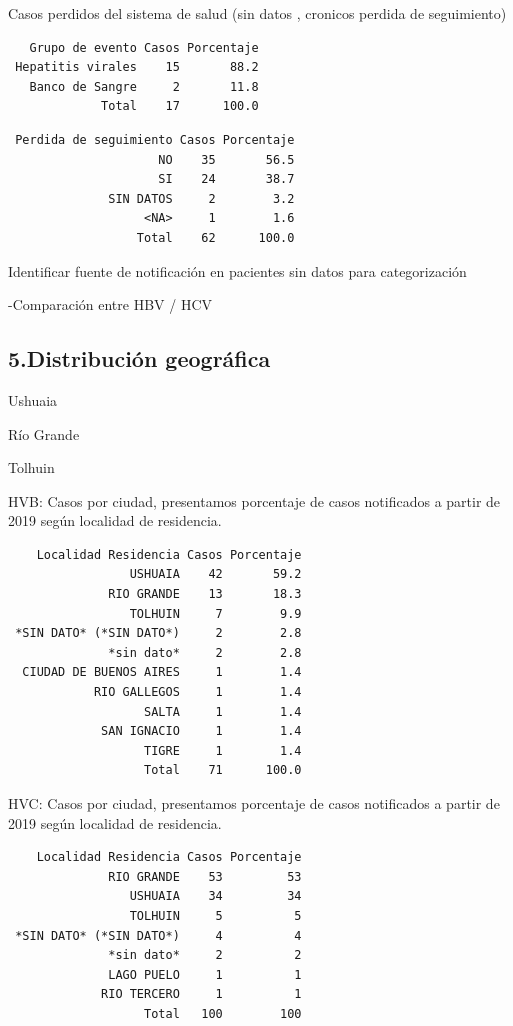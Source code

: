 \documentclass[
  letterpaper,
  DIV=11,
  numbers=noendperiod]{scrartcl}
\begin{document}
Casos perdidos del sistema de salud (sin datos , cronicos perdida de
seguimiento)

\begin{verbatim}
   Grupo de evento Casos Porcentaje
 Hepatitis virales    15       88.2
   Banco de Sangre     2       11.8
             Total    17      100.0
\end{verbatim}

\begin{verbatim}
 Perdida de seguimiento Casos Porcentaje
                     NO    35       56.5
                     SI    24       38.7
              SIN DATOS     2        3.2
                   <NA>     1        1.6
                  Total    62      100.0
\end{verbatim}

Identificar fuente de notificación en pacientes sin datos para
categorización

-Comparación entre HBV / HCV

\hypertarget{distribuciuxf3n-geogruxe1fica}{%
\subsection{\texorpdfstring{\textbf{5.Distribución
geográfica}}{5.Distribución geográfica}}\label{distribuciuxf3n-geogruxe1fica}}

Ushuaia

Río Grande

Tolhuin

HVB: Casos por ciudad, presentamos porcentaje de casos notificados a
partir de 2019 según localidad de residencia.

\begin{verbatim}
    Localidad Residencia Casos Porcentaje
                 USHUAIA    42       59.2
              RIO GRANDE    13       18.3
                 TOLHUIN     7        9.9
 *SIN DATO* (*SIN DATO*)     2        2.8
              *sin dato*     2        2.8
  CIUDAD DE BUENOS AIRES     1        1.4
            RIO GALLEGOS     1        1.4
                   SALTA     1        1.4
             SAN IGNACIO     1        1.4
                   TIGRE     1        1.4
                   Total    71      100.0
\end{verbatim}

HVC: Casos por ciudad, presentamos porcentaje de casos notificados a
partir de 2019 según localidad de residencia.

\begin{verbatim}
    Localidad Residencia Casos Porcentaje
              RIO GRANDE    53         53
                 USHUAIA    34         34
                 TOLHUIN     5          5
 *SIN DATO* (*SIN DATO*)     4          4
              *sin dato*     2          2
              LAGO PUELO     1          1
             RIO TERCERO     1          1
                   Total   100        100
\end{verbatim}
\end{document}
